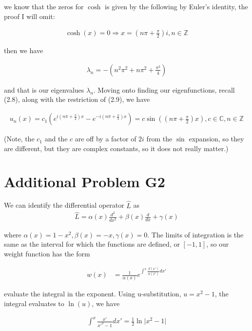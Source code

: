\documentclass{article}
\numberwithin{equation}{section}
\begin{document}
we know that the zeros for $\cosh$ is given by the following by Euler's identity, the proof I will omit:

\begin{align}
    \cosh(x) = 0 \Rightarrow x = (n\pi + \frac{\pi}{2}) i, n \in \mathbb{Z}
\end{align}

then we have

\begin{align}
    \lambda_n = - (n^2 \pi^2 + n \pi^2 + \frac{\pi^2}{4})
\end{align}

and that is our eigenvalues $\lambda_n$. Moving onto finding our eigenfunctions, recall (2.8), along with the restriction of (2.9), we have 

\begin{align}
    u_n (x) = c_1 (e^{i(n\pi + \frac{\pi}{2})x} - e^{- i(n\pi + \frac{\pi}{2})x})= c \sin((n\pi + \frac{\pi}{2})x), c \in \mathbb{C}, n \in \mathbb{Z} 
\end{align} 

(Note, the $c_1$ and the $c$ are off by a factor of $2i$ from the $\sin$ expansion, so they are different, but they are complex constants, so it does not really matter.)

\section{Additional Problem G2}

We can identify the differential operator $\hat{L}$ as \begin{align}
    \hat{L} = \alpha(x) \frac{d^2}{dx^2} + \beta(x) \frac{d}{dx} + \gamma(x) 
\end{align}

where $\alpha(x) = 1-x^2, \beta (x) = -x, \gamma(x) = 0$. The limits of integration is the same as the interval for which the functions are defined, or $[-1,1]$, so our weight function has the form

\begin{align}
    w(x) &= \frac{1}{\alpha(x)} e^{\int^{x}\frac{\beta(x')}{\alpha(x')}dx'}
\end{align}

evaluate the integral in the exponent. Using u-substitution, $u = x^2-1$, the integral evaluates to $\ln(u)$, we have 

\begin{align}
    \int^{x}\frac{x'}{x'^2-1}dx' = \frac{1}{2} \ln \vert x^2-1 \vert
\end{align}
\end{document}
